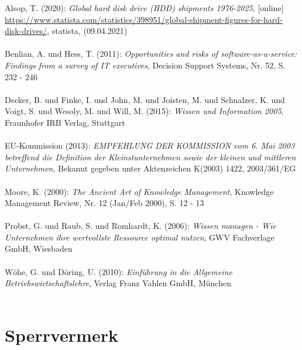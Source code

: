 \documentclass[a4paper]{scrartcl}
\begin{document}
Alsop, T. (2020): \textit{Global hard disk drive (HDD) shipments 1976-2025}, [online] \\ \href{https://www.statista.com/statistics/398951/global-shipment-figures-for-hard-disk-drives/}{https://www.statista.com/statistics/398951/global-shipment-figures-for-hard- \\ disk-drives/}, statista, (09.04.2021) \\ \\
Benlian, A. und Hess, T. (2011): \textit{Opportunities and risks of software-as-a-service: Findings from a survey of IT executives}, Decision Support Systems, Nr. 52, S. 232 - 246 \\ \\
Decker, B. und Finke, I. und John, M. und Joisten, M. und Schnalzer, K. und Voigt, S. und Wesoly, M. und Will, M. (2015): \textit{Wissen und Information 2005}, Fraunhofer IRB Verlag, Stuttgart \\ \\
EU-Kommission (2013): \textit{EMPFEHLUNG DER KOMMISSION vom 6. Mai 2003 betreffend die Definition der Kleinstunternehmen sowie der kleinen und mittleren Unternehmen}, Bekannt gegeben unter Aktenzeichen K(2003) 1422, 2003/361/EG \\ \\
Moore, K. (2000): \textit{The Ancient Art of Knowledge Management}, Knowledge Management Review, Nr. 12 (Jan/Feb 2000), S. 12 - 13 \\ \\
Probst, G. und Raub, S. und Romhardt, K. (2006): \textit{Wissen managen - Wie Unternehmen ihre wertvollste Ressource optimal nutzen}, GWV Fachverlage GmbH, Wiesbaden \\ \\
Wöhe, G. und Döring, U. (2010): \textit{Einführung in die Allgemeine Betriebswirtschaftslehre}, Verlag Franz Vahlen GmbH, München \\ \\



\newpage

\section*{Sperrvermerk}


\onehalfspacing
\end{document}

